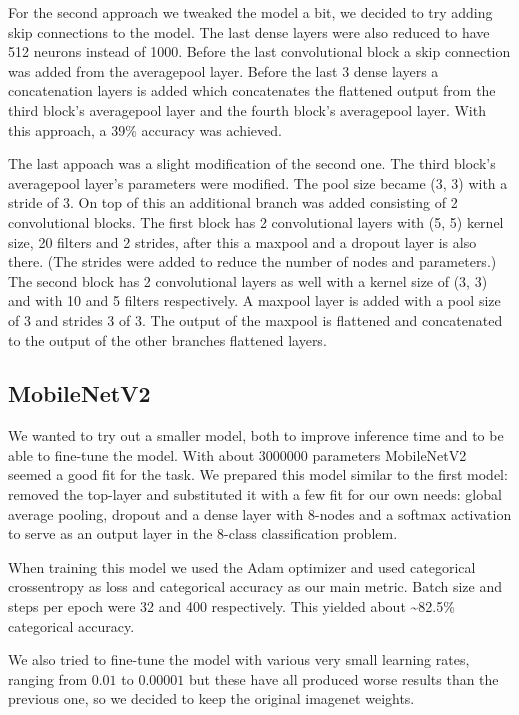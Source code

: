 \documentclass[twocolumn]{article}
\begin{document}
	For the second approach we tweaked the model a bit, we decided to try adding skip connections to the model. The last dense layers were also reduced to have 512 neurons instead of 1000.
	Before the last convolutional block a skip connection was added from the averagepool layer. Before the last 3 dense layers a concatenation layers is added which concatenates the flattened output from the third block's averagepool layer and the fourth block's averagepool layer.
	With this approach, a 39\% accuracy was achieved.
	
	The last appoach was a slight modification of the second one.
	The third block's averagepool layer's parameters were modified. The pool size became (3, 3) with a stride of 3. On top of this an additional branch was added consisting of 2 convolutional blocks. The first block has 2 convolutional layers with (5, 5) kernel size, 20 filters and 2 strides, after this a maxpool and a dropout layer is also there. (The strides were added to reduce the number of nodes and parameters.) 
	The second block has 2 convolutional layers as well with a kernel size of (3, 3) and with 10 and 5 filters respectively. A maxpool layer is added with a pool size of 3 and strides 3 of 3. The output of the maxpool is flattened and concatenated to the output of the other branches flattened layers.
	
	
	\subsection{MobileNetV2}
	
	We wanted to try out a smaller model, both to improve inference time and to be able to fine-tune the model. With about $3000000$ parameters MobileNetV2 seemed a good fit for the task. We prepared this model similar to the first model: removed the top-layer and substituted it with a few fit for our own needs: global average pooling, dropout and a dense layer with 8-nodes and a softmax activation to serve as an output layer in the 8-class classification problem.
	
	When training this model we used the Adam optimizer and used categorical crossentropy as loss and categorical accuracy as our main metric. Batch size and steps per epoch were 32 and 400 respectively. This yielded about \textasciitilde82.5\% categorical accuracy.
	
	We also tried to fine-tune the model with various very small learning rates, ranging from $0.01$ to $0.00001$ but these have all produced worse results than the previous one, so we decided to keep the original imagenet weights.
	
\end{document}
